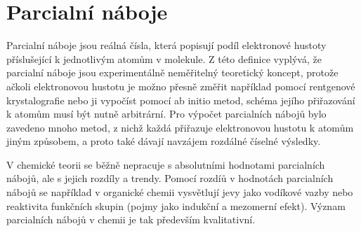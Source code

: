 \documentclass[10pt,draft,oneside]{fithesis2}
\newcommand\todo[1]{\textcolor{red}{[[#1]]}}
\renewcommand\todo[1]{}
\begin{document}



\todo{parcialní náboje mají fyzikální smysl}

\todo{experimentalni dukazy spektroskopie}

\todo{polarita molekul}

\todo{vyuziti naboju k fitovani vlastnosti}

\todo{dipolove momenty, ...}








\chapter{Parcialní náboje}

Parcialní náboje jsou reálná čísla, která popisují podíl elektronové hustoty příslušející k jednotlivým atomům v molekule.  Z této definice vyplývá, že parcialní náboje jsou experimentálně neměřitelný teoretický koncept, protože ačkoli elektronovou hustotu je možno přesně změřit například pomocí rentgenové krystalografie nebo ji vypočíst pomocí ab initio metod, schéma jejího přiřazování k atomům musí být nutně arbitrární. Pro výpočet parcialních nábojů bylo zavedeno mnoho metod, z nichž každá přiřazuje elektronovou hustotu k atomům jiným způsobem, a proto také dávají navzájem rozdálné číselné výsledky.

V chemické teorii se běžně nepracuje s absolutními hodnotami parcialních nábojů, ale s jejich rozdíly a trendy. Pomocí rozdíů v hodnotách parcialních nábojů se například v organické chemii vysvětlují jevy jako vodíkové vazby nebo reaktivita funkčních skupin (pojmy jako indukční a mezomerní efekt). Význam parcialních nábojů v chemii je tak především kvalitativní.
\end{document}
